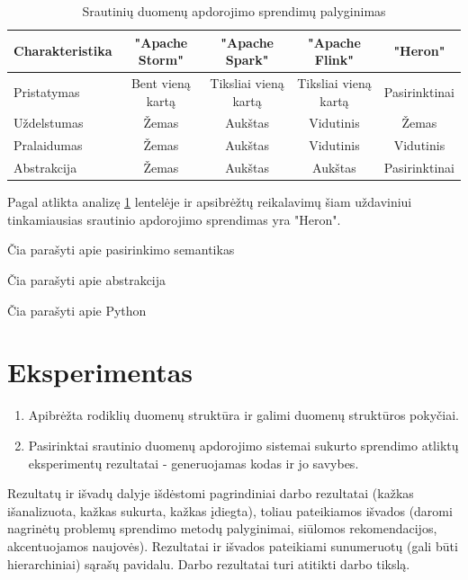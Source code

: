 \documentclass{VUMIFPSbakalaurinis}
\begin{document}
\begin{table}[!htbp]
    \begin{center}
        \caption{Srautinių duomenų apdorojimo sprendimų palyginimas}
        \label{table:comparer}
        \begin{tabular}{ | l | c | c | c | c | } 
            \hline
            \cellcolor[gray]{0.8} Charakteristika & \cellcolor[gray]{0.9} "Apache Storm" & \cellcolor[gray]{0.9} "Apache Spark" & \cellcolor[gray]{0.9} "Apache Flink" & \cellcolor[gray]{0.9} "Heron" \\* \hline
            \cellcolor[gray]{0.9} Pristatymas & Bent vieną kartą & Tiksliai vieną kartą & Tiksliai vieną kartą & Pasirinktinai \\* \hline
            \cellcolor[gray]{0.9} Uždelstumas & Žemas & Aukštas & Vidutinis & Žemas \\* \hline
            \cellcolor[gray]{0.9} Pralaidumas & Žemas & Aukštas & Vidutinis & Vidutinis \\* \hline
            \cellcolor[gray]{0.9} Abstrakcija & Žemas & Aukštas & Aukštas & Pasirinktinai \\* \hline
        \end{tabular}
    \end{center}
\end{table}\par

Pagal atlikta analizę \ref{table:comparer} lentelėje ir apsibrėžtų reikalavimų šiam uždaviniui tinkamiausias srautinio apdorojimo sprendimas yra "Heron". \par
Čia parašyti apie pasirinkimo semantikas \par
Čia parašyti apie abstrakcija \par
Čia parašyti apie Python \par
 

\section{Eksperimentas}



\begin{enumerate}
    \item Apibrėžta rodiklių duomenų struktūra ir galimi duomenų struktūros pokyčiai.
    \item Pasirinktai srautinio duomenų apdorojimo sistemai sukurto sprendimo atliktų eksperimentų rezultatai - generuojamas kodas ir jo savybes. 
\end{enumerate}

Rezultatų ir išvadų dalyje išdėstomi pagrindiniai darbo rezultatai (kažkas
išanalizuota, kažkas sukurta, kažkas įdiegta), toliau pateikiamos išvados
(daromi nagrinėtų problemų sprendimo metodų palyginimai, siūlomos
rekomendacijos, akcentuojamos naujovės). Rezultatai ir išvados pateikiami
sunumeruotų (gali būti hierarchiniai) sąrašų pavidalu. Darbo rezultatai turi
atitikti darbo tikslą.

\printbibliography[heading=bibintoc] 


\appendix 
\end{document}
